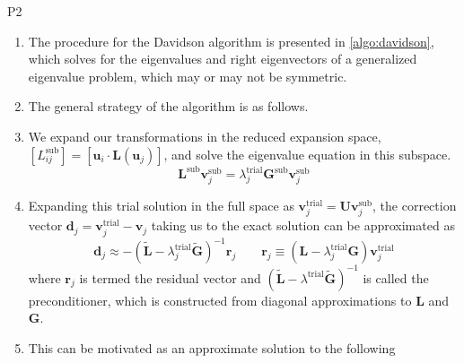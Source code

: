 \noindent
P2
\begin{enumerate}
    \item
        The procedure for the Davidson algorithm is presented in
        \cref{algo:davidson}, which solves for the eigenvalues and right
        eigenvectors of a generalized eigenvalue problem, which may or may not
        be symmetric.
    \item
        The general strategy of the algorithm is as follows.
    \item
        We expand our transformations in the reduced expansion space,
        \(
            [L_{ij}^\mathrm{sub}]
            =
            [\mathbf{u}_i\cdot \mathbf{L}(\mathbf{u}_j)]
        \),
        and solve the eigenvalue equation in this subspace.
        \begin{equation}
            \mathbf{L}^\mathrm{sub}
            \mathbf{v}_j^\mathrm{sub}
            =
            \lambda_j^\mathrm{trial}
            \mathbf{G}^\mathrm{sub}
            \mathbf{v}_j^\mathrm{sub}
        \end{equation}
    \item
        Expanding this trial solution in the full space as
        \(
            \mathbf{v}_j^\mathrm{trial}
            =
            \mathbf{U}\mathbf{v}_j^\mathrm{sub}
        \),
        the correction vector
        \(
            \mathbf{d}_j
            =
            \mathbf{v}_j^\mathrm{trial}
            -
            \mathbf{v}_j
        \)
        taking us to the exact solution can be approximated as
        \begin{equation}
            \label{eq:davidson:davidson-step}
            \mathbf{d}_j
            \approx
            -
            (
                \tilde{\mathbf{L}}
                -
                \lambda_j^\mathrm{trial}
                \tilde{\mathbf{G}}
            )^{-1}
            \mathbf{r}_j
            \qquad
            \mathbf{r}_j
            \equiv
            (\mathbf{L} - \lambda_j^\mathrm{trial}\mathbf{G})
            \mathbf{v}_j^\mathrm{trial}
        \end{equation}
        where \(\mathbf{r}_j\) is termed the residual vector and
        \(
            (
                \tilde{\mathbf{L}} - \lambda^\mathrm{trial}\tilde{\mathbf{G}}
            )^{-1}
        \)
        is called the preconditioner, which is constructed from diagonal
        approximations to \(\mathbf{L}\) and \(\mathbf{G}\).
    \item
        This can be motivated as an approximate solution to the following

\end{enumerate}
